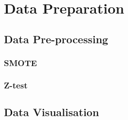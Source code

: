 \chapter{Data Preparation}

\section{Data Pre-processing}

\subsection{SMOTE}

\subsection{Z-test}

\section{Data Visualisation}





